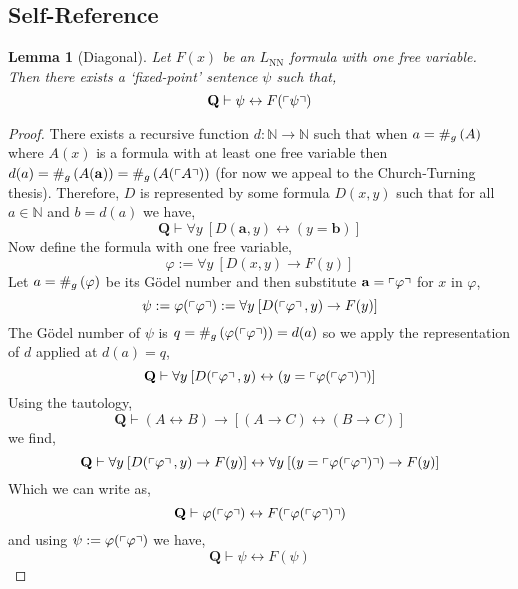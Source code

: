 \documentclass[12pt, leqno]{article}
\newcommand{\N}{\mathbb{N}}
\renewcommand{\bf}[1]{\mathbf{#1}}
\newcommand{\proves}{\vdash}
\newcommand{\uq}[1]{\forall{#1} \:}
\theoremstyle{theorem}
\newtheorem{lemma}[theorem]{Lemma}
\theoremstyle{definition}
\theoremstyle{definition}
\theoremstyle{remark}
\theoremstyle{definition}
\theoremstyle{remark}
\begin{document}
\subsection{Self-Reference}

\begin{lemma}[Diagonal]
Let $F(x)$ be an $L_{\mathrm{NN}}$ formula with one free variable. Then there exists a `fixed-point' sentence $\psi$ such that,
\[ \bf{Q} \proves \psi \leftrightarrow F(\Gterm{\psi}) \]
\end{lemma}

\begin{proof}
There exists a recursive function $d : \N \to \N$ such that when $a = \#_g\left( A \right)$ where $A(x)$ is a formula with at least one free variable then $d(a) = \Gnum{A(\bf{a})} = \Gnum{A(\Gterm{A})}$ (for now we appeal to the Church-Turning thesis). Therefore, $D$ is represented by some formula $D(x, y)$ such that for all $a \in \N$ and $b = d(a)$ we have,
\[ \bf{Q} \proves \uq{y} [ D(\bf{a}, y) \leftrightarrow (y = \bf{b}) ] \]
Now define the formula with one free variable,
\[ \varphi := \uq{y} [D(x, y) \to F(y) ] \]
Let $a = \#_g\left( \varphi \right)$ be its G\"{o}del number and then substitute $\bf{a} = \Gterm{\varphi}$ for $x$ in $\varphi$,
\[ \psi := \varphi(\Gterm{\varphi}) := \uq{y} [D(\Gterm{\varphi}, y) \to F(y)] \]
The G\"{o}del number of $\psi$ is $q = \#_g\left( \varphi(\left\ulcorner \varphi \right\urcorner) \right) = d(a)$ so we apply the representation of $d$ applied at $d(a) = q$,
\[ \bf{Q} \proves \uq{y} [D(\Gterm{\varphi}, y) \leftrightarrow (y = \Gterm{\varphi(\Gterm{\varphi})})] \] 
Using the tautology,
\[ \bf{Q} \proves (A \leftrightarrow B) \to [(A \to C) \leftrightarrow (B \to C)] \]
we find,
\[ \bf{Q} \proves \uq{y} [D(\Gterm{\varphi}, y) \to F(y)] \leftrightarrow \uq{y} [(y = \Gterm{\varphi(\Gterm{\varphi})}) \to F(y)] \]
Which we can write as,
\[ \bf{Q} \proves \varphi(\Gterm{\varphi}) \leftrightarrow F(\Gterm{\varphi(\Gterm{\varphi})}) \]
and using $\psi := \varphi(\left\ulcorner \varphi \right\urcorner)$ we have,
\[ \bf{Q} \proves \psi \leftrightarrow F(\psi) \] 
\end{proof}
\end{document}
